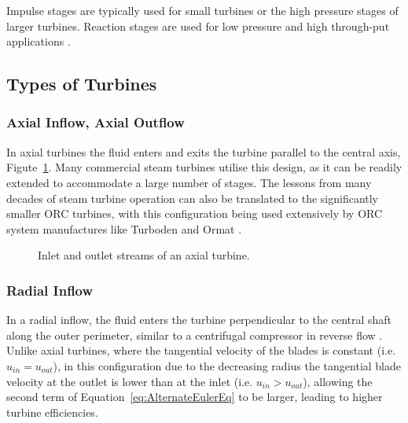         Impulse stages are typically used for small turbines or the high pressure stages of larger turbines. Reaction stages are used for low pressure and high through-put applications \cite{Smith2005}.    

    \subsection{Types of Turbines}

         \subsubsection{Axial Inflow, Axial Outflow}
            In axial turbines the fluid enters and exits the turbine parallel to the central axis, Figute~\ref{fig:prosim_litrev_axial_turbine}. Many commercial steam turbines utilise this design, as it can be readily extended to accommodate a large number of stages. The lessons from many decades of steam turbine operation can also be translated to the significantly smaller \ac{ORC} turbines, with this configuration being used extensively by \ac{ORC} system manufactures like Turboden \cite{Turboden2024} and Ormat \cite{Ormat2024, Buchanan2010}.

            \begin{figure}[H]
                \centering
                
                \caption{Inlet and outlet streams of an axial turbine.}
                \label{fig:prosim_litrev_axial_turbine}
            \end{figure}
    
        \subsubsection{Radial Inflow}
            In a radial inflow, the fluid enters the turbine perpendicular to the central shaft along the outer perimeter, similar to a centrifugal compressor in reverse flow \cite{Boyce2012}. Unlike axial turbines, where the tangential velocity of the blades is constant (i.e. \(u_{in}=u_{out}\)), in this configuration due to the decreasing radius the tangential blade velocity at the outlet is lower than at the inlet (i.e. \(u_{in}>u_{out}\)), allowing the second term of Equation~\ref{eq:AlternateEulerEq} to be larger, leading to higher turbine efficiencies.


